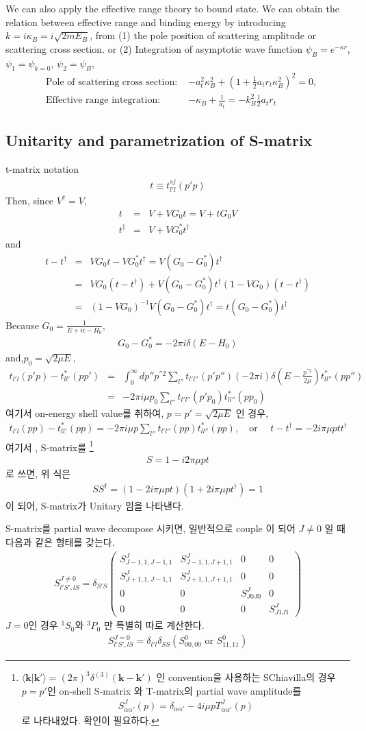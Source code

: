 \documentclass[10pt]{article}
\def\bm{\boldsymbol}
\newcommand{\bea}{\begin{eqnarray}}
\newcommand{\eea}{\end{eqnarray}}
\newcommand{\no}{\nonumber \\}
\def\vk{{\bm k}}
\def\la{\langle}
\def\ra{\rangle}
\begin{document}
We can also apply the effective range theory to bound state. 
We can obtain the relation between effective range and binding energy 
by introducing $k=i \kappa_B=i\sqrt{2 m E_B}$,
from (1) the pole position of scattering amplitude or scattering cross section.
or (2) Integration of asymptotic wave function $\psi_B=e^{-\kappa r}$,
$\psi_1=\psi_{k=0}$, $\psi_2=\psi_{B}$,
\bea
&\mbox{Pole of scattering cross section: }& -a_t^2 \kappa^2_B+(1+\frac{1}{2} a_t r_t \kappa_B^2)^2=0, \no 
&\mbox{Effective range integration: } & -\kappa_B+\frac{1}{a_t} = -k_B^2\frac{1}{2}a_t r_t
\eea 


\subsection{Unitarity and parametrization of S-matrix }
t-matrix notation
\bea
t\equiv t^{sj}_{l'l}(p'p)
\eea
Then, since $V^\dagger=V$,
\bea
t&=&V+VG_0t=V+tG_0 V\no 
t^\dagger&=&V+VG_0^* t^\dagger
\eea
and
\bea
t-t^\dagger&=&VG_0t-VG_0^* t^\dagger=V(G_0-G_0^*)t^\dagger\no
                 &=&VG_0(t-t^\dagger)+V(G_0-G_0^*)t^\dagger(1-VG_0)(t-t^\dagger)\no
                 & =&(1-VG_0)^{-1}V(G_0-G_0^*)t^\dagger
                   =t(G_0-G_0^*)t^\dagger
\eea
Because $G_0=\frac{1}{E+i\epsilon-H_0}$,
\bea
G_0-G_0^*=-2\pi i\delta(E-H_0)
\eea
and,$p_0=\sqrt{2\mu E}$,
\bea
t_{l'l}(p'p)-t^*_{ll'}(pp')
&=&\int_0^\infty dp'' p^{''2}\sum_{l''}t_{l'l''}(p'p'')(-2\pi i)\delta(E-\frac{p^{''2}}{2\mu})
     t^*_{ll''}(pp'')\no
&=&-2\pi i \mu p_0\sum_{l''}t_{l'l''}(p' p_0)t^*_{ll''}(p p_0)
\eea
여기서 on-energy shell value를 취하여, $p=p'=\sqrt{2\mu E}$ 인 경우,
\bea
t_{l'l}(pp)-t^*_{ll'}(pp)=-2\pi i \mu p\sum_{l''}t_{l' l''}(pp)t^*_{l l''}(pp),\quad
\mbox{or }\quad t-t^\dagger=-2i\pi \mu p t t^\dagger
\eea
여기서 , S-matrix를 \footnote{
$\la \vk|\vk'\ra=(2\pi)^3\delta^{(3)}(\vk-\vk')$
인 convention을 사용하는 SChiavilla의 경우 $p=p'$인 
on-shell S-matrix 와 T-matrix의 
partial wave amplitude를
\bea
S^J_{\alpha\alpha'}(p)=\delta_{\alpha\alpha'}-4i \mu p T^J_{\alpha\alpha'}(p)
\eea
로 나타내었다. 확인이 필요하다.
}
\bea
S=1-i2\pi \mu p t
\eea
로 쓰면, 위 식은 
\bea
S S^\dagger=(1-2i\pi \mu p t)(1+2i\pi \mu p t^\dagger)=1
\eea
이 되어, S-matrix가 Unitary 임을 나타낸다. 

S-matrix를 partial wave decompose 시키면,
일반적으로 couple 이 되어 $J\neq 0$ 일 때 다음과 같은 형태를 갖는다.
\bea
S^{J\neq 0}_{l' S', l S}=\delta_{S'S}\left(
\begin{array}{cccc}
 S^{J}_{J-1,1,J-1,1} & S^J_{J-1,1, J+1,1} & 0 & 0 \\
 S^{J}_{J+1,1,J-1,1} & S^J_{J+1,1, J+1,1} & 0 & 0 \\
0 & 0 & S^J_{J 0 J0} & 0\\
0 & 0 & 0 & S^J_{J1 J1}
\end{array}
\right)
\eea
$J=0$인 경우 $^1S_0$와 $^3P_0$ 만 특별히 따로 계산한다.
\bea
S^{J=0}_{l'S',lS}=\delta_{l'l}\delta_{SS} (S^0_{00,00}\mbox{ or } S^0_{11,11})                   
\eea
\end{document}
